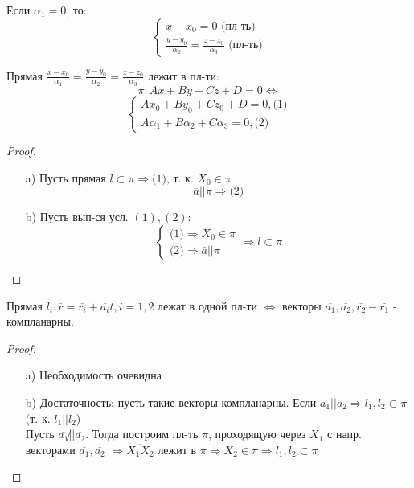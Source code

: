  Если $\alpha_1 = 0$, то:
 \[
 \begin{cases}
 x - x_0 = 0 \text{ (пл-ть)} \\
 \frac{y - y_0}{\alpha_2} = \frac{z - z_0}{\alpha_3} \text{ (пл-ть)}
 \end{cases}
 \]
 \begin{statement}
 Прямая $\frac{x - x_0}{\alpha_1} = \frac{y - y_0}{\alpha_2} = \frac{z - z_0}{\alpha_3}$ лежит в пл-ти:
 \[
 \pi\colon Ax + By + Cz + D = 0 \iff
 \]
 \[
 \begin{cases}
 Ax_0 + By_0 + Cz_0 + D = 0, \text{(1)} \\
 A\alpha_1 + B\alpha_2 + C\alpha_3 = 0, \text{(2)}
 \end{cases}
 \]
 \end{statement}
 \begin{proof}
   \begin{itemize}
     \item [a) ]
 Пусть прямая $l \subset \pi \Rightarrow \text{(1), т. к. $X_0 \in \pi$}$ \\
 \[
 \overline{a} || \pi \Rightarrow \text{(2)}
 \]
\item [b) ] Пусть вып-ся усл. $(1), (2)$:
  \[
  \begin{cases}
  \text{(1)} \Rightarrow X_0 \in \pi \\
  \text{(2)} \Rightarrow \overline{a} || \pi
  \end{cases} \Rightarrow l \subset \pi
  \]
   \end{itemize}
 \end{proof}
 \begin{statement}
  Прямая $l_i \colon \overline{r} = \overline{r_i} + \overline{a_i}t, i = 1, 2$ лежат в одной пл-ти $\iff$ векторы $\overline{a_1}, \overline{a_2}, \overline{r_2} - \overline{r_1}$ -  компланарны.
 \end{statement}
 \begin{proof}
 \begin{itemize}
   \item [a) ] Необходимость очевидна
   \item [b) ] Достаточность: пусть такие векторы компланарны.
     Если $\overline{a_1} || \overline{a_2} \Rightarrow l_1, l_2 \subset \pi$ (т. к. $l_1 || l_2$) \\

     Пусть $\overline{a_1} \not|| \overline{a_2}$. Тогда построим пл-ть $\pi$, проходящую через $X_1$ с напр. векторами $\overline{a_1}, \overline{a_2}$ $\Rightarrow \overline{X_1 X_2}$ лежит в $\pi \Rightarrow X_2 \in \pi \Rightarrow l_1, l_2 \subset \pi$
 \end{itemize}
 \end{proof}
